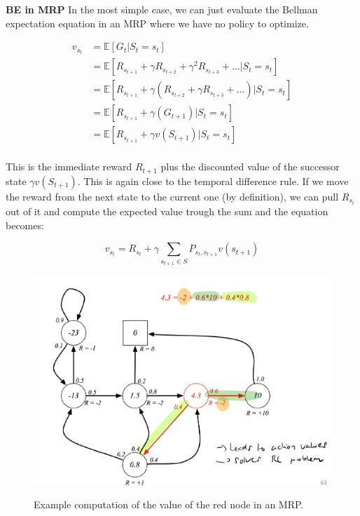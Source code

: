 \documentclass[main]{subfiles}
\begin{document}
\textbf{BE in MRP}
In the most simple case, we can just evaluate the Bellman expectation equation in an MRP where we have no policy to optimize.

\begin{align}
    v_{s_t} &= \mathbb{E}[G_t|S_t = s_t] \\
    & = \mathbb{E}[R_{s_{t+1}} + \gamma R_{s_{t+2}} + \gamma^2 R_{s_{t+3}} + \dots| S_t = s_t] \\
    & = \mathbb{E}[R_{s_{t+1}} + \gamma (R_{s_{t+2}} + \gamma R_{s_{t+3}} + \dots)| S_t = s_t] \\
    & = \mathbb{E}[R_{s_{t+1}} + \gamma (G_{t+1})| S_t = s_t] \\
    & = \mathbb{E}[R_{s_{t+1}} + \gamma v(S_{t+1})| S_t = s_t] \\
\end{align}

This is the immediate reward $R_{t+1}$ plus the discounted value of the successor state $\gamma v(S_{t+1})$.
This is again close to the temporal difference rule. 
If we move the reward from the next state to the current one (by definition), we can pull $R_{s_t}$ out of it and compute the expected value trough the sum and the equation becomes:

\begin{equation}
   v_{s_t} = R_{s_t} + \gamma \sum_{s_{t+1} \in S} P_{s_t,s_{t+1}} v(s_{t+1})
\end{equation}

\begin{figure}[H]
	\centering
	\includegraphics[width=0.9\linewidth]{08_ReinforcementLearning/figures/bellmann-mrp.png}
	\label{fig:mrp-example}
	\caption{Example computation of the value of the red node in an MRP.}
\end{figure}
\end{document}

